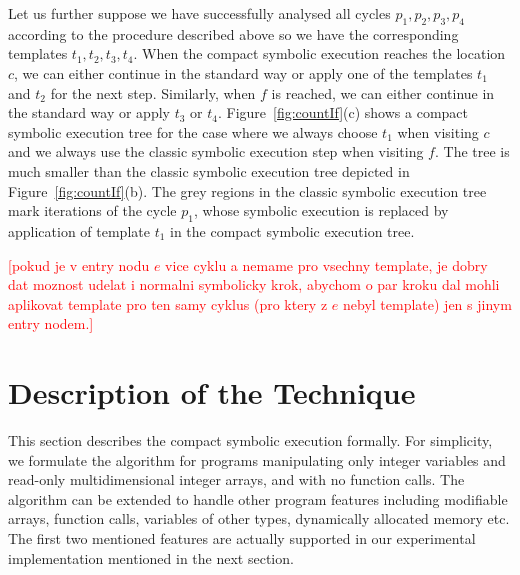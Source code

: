 \documentclass{sig-alternate}%
\newcommand{\todo}[1]{{\scriptsize{{\textcolor{red}{[#1]}}}}}
\begin{document}

Let us further suppose we have successfully analysed all cycles
$p_1,p_2,p_3,p_4$ according to the procedure described above so we have the
corresponding templates $t_1,t_2,t_3,t_4$. When the compact symbolic
execution reaches the location $c$, we can either continue in the standard
way or apply one of the templates $t_1$ and $t_2$ for the next
step. Similarly, when $f$ is reached, we can either continue in the standard
way or apply $t_3$ or $t_4$. Figure~\ref{fig:countIf}(c) shows a compact
symbolic execution tree for the case where we always choose $t_1$ when
visiting $c$ and we always use the classic symbolic execution step when
visiting $f$. The tree is much smaller than the classic symbolic execution
tree depicted in Figure~\ref{fig:countIf}(b). The grey regions in the
classic symbolic execution tree mark iterations of the cycle $p_1$, whose
symbolic execution is replaced by application of template $t_1$ in the
compact symbolic execution tree.

\todo{pokud je v entry nodu $e$ vice cyklu a nemame pro vsechny template,
je dobry dat moznost udelat i normalni symbolicky krok, abychom o par kroku
dal mohli aplikovat template pro ten samy cyklus (pro ktery z $e$ nebyl
template) jen s jinym entry nodem.}


\section{Description of the Technique}\label{sec:technique}

This section describes the compact symbolic execution formally. For
simplicity, we formulate the algorithm for programs manipulating only
integer variables and read-only multidimensional integer arrays, and with no
function calls. The algorithm can be extended to handle other program
features including modifiable arrays, function calls, variables of other
types, dynamically allocated memory etc. The first two mentioned features
are actually supported in our experimental implementation mentioned in the
next section.

\end{document}
